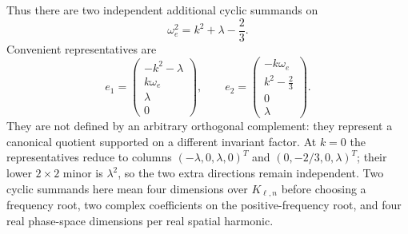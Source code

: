 \documentclass[11pt]{article}
\theoremstyle{remark}
\begin{document}
Thus there are two independent additional cyclic summands on
\begin{equation}\label{eq:extra-shell}
 \omega_e^2=k^2+\lambda-\frac23.
\end{equation}
Convenient representatives are
\begin{equation}\label{eq:extra-reps}
 e_1=\begin{pmatrix}-k^2-\lambda\\k\omega_e\\\lambda\\0\end{pmatrix},
 \qquad
 e_2=\begin{pmatrix}-k\omega_e\\k^2-\frac23\\0\\\lambda\end{pmatrix}.
\end{equation}
They are not defined by an arbitrary orthogonal complement: they represent a
canonical quotient supported on a different invariant factor.
At $k=0$ the representatives reduce to columns
$(-\lambda,0,\lambda,0)^T$ and
$(0,-2/3,0,\lambda)^T$; their lower $2\times2$ minor is $\lambda^2$, so the
two extra directions remain independent. Two cyclic summands here mean four
dimensions over $K_{\ell,n}$ before choosing a frequency root, two complex
coefficients on the positive-frequency root, and four real phase-space
dimensions per real spatial harmonic.
\end{document}
